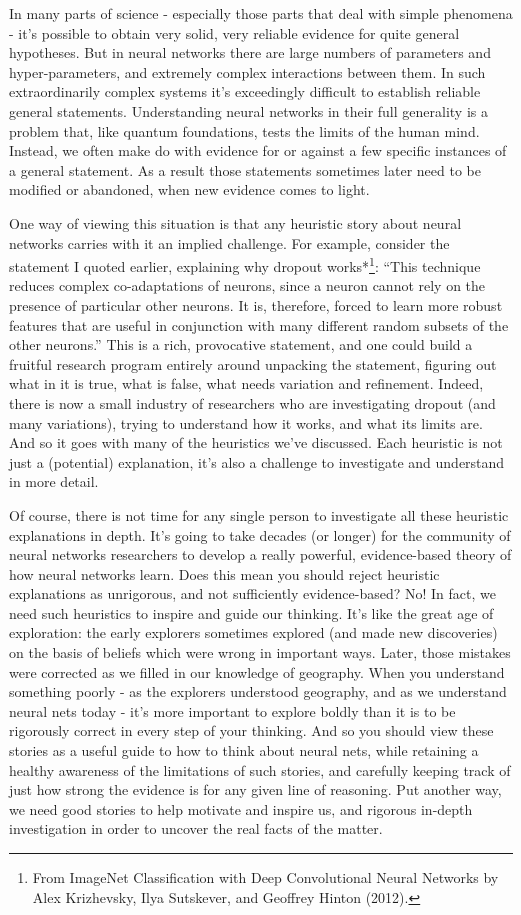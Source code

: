 In many parts of science - especially those parts that deal with simple phenomena - it's possible to obtain very solid, very reliable evidence for quite general hypotheses. But in neural networks there are large numbers of parameters and hyper-parameters, and extremely complex interactions between them. In such extraordinarily complex systems it's exceedingly difficult to establish reliable general statements. Understanding neural networks in their full generality is a problem that, like quantum foundations, tests the limits of the human mind. Instead, we often make do with evidence for or against a few specific instances of a general statement. As a result those statements sometimes later need to be modified or abandoned, when new evidence comes to light.


One way of viewing this situation is that any heuristic story about neural networks carries with it an implied challenge. For example, consider the statement I quoted earlier, explaining why dropout works*\footnote{From ImageNet Classification with Deep Convolutional Neural Networks by Alex Krizhevsky, Ilya Sutskever, and Geoffrey Hinton (2012).}: ``This technique reduces complex co-adaptations of neurons, since a neuron cannot rely on the presence of particular other neurons. It is, therefore, forced to learn more robust features that are useful in conjunction with many different random subsets of the other neurons.'' This is a rich, provocative statement, and one could build a fruitful research program entirely around unpacking the statement, figuring out what in it is true, what is false, what needs variation and refinement. Indeed, there is now a small industry of researchers who are investigating dropout (and many variations), trying to understand how it works, and what its limits are. And so it goes with many of the heuristics we've discussed. Each heuristic is not just a (potential) explanation, it's also a challenge to investigate and understand in more detail.


Of course, there is not time for any single person to investigate all these heuristic explanations in depth. It's going to take decades (or longer) for the community of neural networks researchers to develop a really powerful, evidence-based theory of how neural networks learn. Does this mean you should reject heuristic explanations as unrigorous, and not sufficiently evidence-based? No! In fact, we need such heuristics to inspire and guide our thinking. It's like the great age of exploration: the early explorers sometimes explored (and made new discoveries) on the basis of beliefs which were wrong in important ways. Later, those mistakes were corrected as we filled in our knowledge of geography. When you understand something poorly - as the explorers understood geography, and as we understand neural nets today - it's more important to explore boldly than it is to be rigorously correct in every step of your thinking. And so you should view these stories as a useful guide to how to think about neural nets, while retaining a healthy awareness of the limitations of such stories, and carefully keeping track of just how strong the evidence is for any given line of reasoning. Put another way, we need good stories to help motivate and inspire us, and rigorous in-depth investigation in order to uncover the real facts of the matter.
